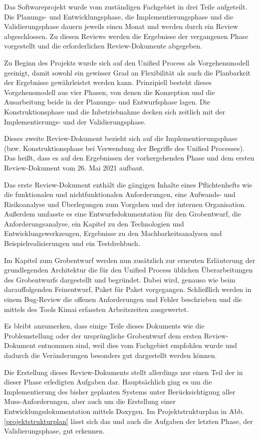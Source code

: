 \documentclass[../review_2.tex]{subfiles}
\begin{document}
    Das Softwareprojekt wurde vom zuständigen Fachgebiet in drei Teile aufgeteilt. Die Planungs- und Entwicklungsphase, die Implementierungsphase und die Validierungsphase dauern jeweils einen Monat und werden durch ein Review abgeschlossen. Zu diesen Reviews werden die Ergebnisse der vergangenen Phase vorgestellt und die erforderlichen Review-Dokumente abgegeben.
    
    Zu Beginn des Projekts wurde sich auf den Unified Process als Vorgehensmodell geeinigt, damit sowohl ein gewisser Grad an Flexibilität als auch die Planbarkeit der Ergebnisse gewährleistet werden kann. Prinzipiell besteht dieses Vorgehensmodell aus vier Phasen, von denen die Konzeption und die Ausarbeitung beide in der Planungs- und Entwurfsphase lagen. Die Konstruktionsphase und die Inbetriebnahme decken sich zeitlich mit der Implementierungs- und der Validierungsphase.
    
    Dieses zweite Review-Dokument bezieht sich auf die Implementierungsphase (bzw. Konstruktionsphase bei Verwendung der Begriffe des Unified Processes). Das heißt, dass es auf den Ergebnissen der vorhergehenden Phase und dem ersten Review-Dokument vom 26. Mai 2021 aufbaut.
    
    Das erste Review-Dokument enthält die gängigen Inhalte eines Pflichtenhefts wie die funktionalen und nichtfunktionalen Anforderungen, eine Aufwands- und Risikoanalyse und Überlegungen zum Vorgehen und der internen Organisation. Außerdem umfasste es eine Entwurfsdokumentation für den Grobentwurf, die Anforderungsanalyse, ein Kapitel zu den Technologien und Entwicklungswerkzeugen, Ergebnisse zu den Machbarkeitsanalysen und Beispielrealisierungen und ein Testdrehbuch.
    
    Im Kapitel zum Grobentwurf werden nun zusätzlich zur erneuten Erläuterung der grundlegenden Architektur die für den Unified Process üblichen Überarbeitungen des Grobentwurfs dargestellt und begründet. Dabei wird, genauso wie beim darauffolgenden Feinentwurf, Paket für Paket vorgegangen. Schließlich werden in einem Bug-Review die offenen Anforderungen und Fehler beschrieben und die mittels des Tools Kimai erfassten Arbeitszeiten ausgewertet.
    
    Es bleibt anzumerken, dass einige Teile dieses Dokuments wie die Problemstellung oder der ursprüngliche Grobentwurf dem ersten Review-Dokument entnommen sind, weil dies vom Fachgebiet empfohlen wurde und dadurch die Veränderungen besonders gut dargestellt werden können.
    
    Die Erstellung dieses Review-Dokuments stellt allerdings nur einen Teil der in dieser Phase erledigten Aufgaben dar. Hauptsächlich ging es um die Implementierung des bisher geplanten Systems unter Berücksichtigung aller Muss-Anforderungen, aber auch um die Erstellung einer Entwicklungsdokumentation mittels Doxygen. Im Projektstrukturplan in Abb. \ref{projektstrukturplan} lässt sich das und auch die Aufgaben der letzten Phase, der Validierungsphase, gut erkennen.
    
\end{document}
